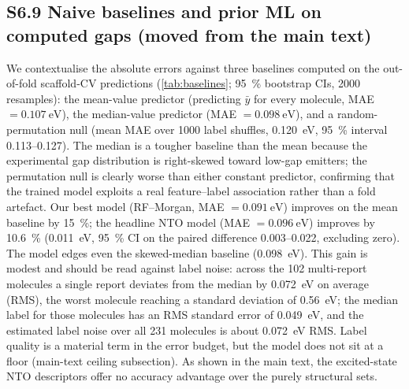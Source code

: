 \documentclass[final,3p,times,twocolumn]{elsarticle}
\makeatletter
\newcommand{\silabel}[2]{\phantomsection\protected@edef\@currentlabel{#1}\label{#2}}
\makeatother
\begin{document}
\subsection*{S6.9 Naive baselines and prior ML on computed gaps (moved from the main text)}\silabel{S6.9}{sec:baselines_prior}
We contextualise the absolute errors against three
baselines computed on the out-of-fold scaffold-CV predictions
(\cref{tab:baselines}; \qty{95}{\percent} bootstrap CIs, \num{2000} resamples):
the mean-value predictor (predicting $\bar{y}$ for every molecule,
MAE $= \qty{0.107}{\electronvolt}$), the median-value predictor
(MAE $= \qty{0.098}{\electronvolt}$), and a random-permutation null (mean MAE
over \num{1000} label shuffles, \qty{0.120}{\electronvolt}, \qty{95}{\percent}
interval \numrange{0.113}{0.127}).
The median is a tougher baseline than the mean because the experimental gap
distribution is right-skewed toward low-gap emitters; the permutation null is
clearly worse than either constant predictor, confirming that the trained model
exploits a real feature--label association rather than a fold artefact.
Our best model (RF--Morgan, MAE $= \qty{0.091}{\electronvolt}$) improves on the
mean baseline by \qty{15}{\percent}; the headline NTO model
(MAE $= \qty{0.096}{\electronvolt}$) improves by \qty{10.6}{\percent}
(\qty{0.011}{\electronvolt}, \qty{95}{\percent} CI on the paired difference
\numrange{0.003}{0.022}, excluding zero). The model edges even the skewed-median
baseline (\qty{0.098}{\electronvolt}).
This gain is modest and should be read against label noise: across the \num{102}
multi-report molecules a single report deviates from the median by
\qty{0.072}{\electronvolt} on average (RMS), the worst molecule reaching a standard
deviation of \qty{0.56}{\electronvolt}; the median label for those molecules has an RMS
standard error of \qty{0.049}{\electronvolt}, and the estimated label noise over all
\num{231} molecules is about \qty{0.072}{\electronvolt} RMS. Label quality is a material
term in the error budget, but the model does not sit at a floor (main-text ceiling subsection).
As shown in the main text, the excited-state NTO descriptors offer no
accuracy advantage over the purely structural sets.
\end{document}
